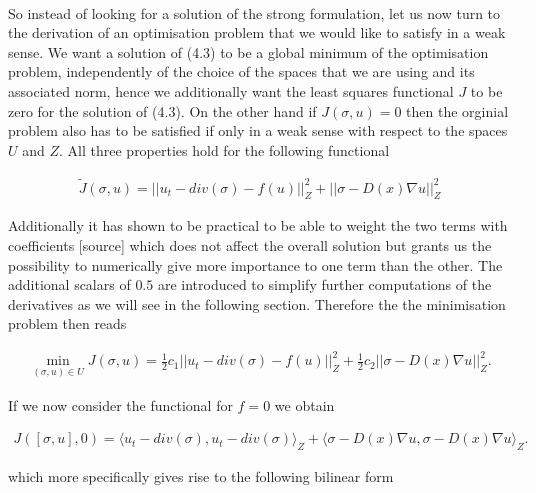 \documentclass[../draft_1.tex]{subfiles}
\begin{document}
\smallskip
\\
So instead of looking for a solution of the strong formulation, let us now turn to the derivation of an optimisation problem that we would like to satisfy in a weak sense. We want a solution of (4.3) to be a global minimum of the optimisation problem, independently of the choice of the spaces that we are using and its associated norm, hence we additionally want the least squares functional $J$ to be zero for the solution of (4.3). On the other hand if $J(\sigma, u) = 0$ then the orginial problem also has to be satisfied if only in a weak sense with respect to the spaces $U$ and $Z$. All three properties hold for the following functional  
\begin{ceqn}
\begin{align}
\tilde{J}(\sigma, u) =|| u_t - div(\sigma) - f(u) ||_Z^2 + || \sigma - D(x) \nabla u || _Z^2
\end{align}
\end{ceqn}
Additionally it has shown to be practical to be able to weight the two terms with coefficients [source] which does not affect the overall solution but grants us the possibility to numerically give more importance to one term than the other. The additional scalars of $0.5$ are introduced to simplify further computations of the derivatives as we will see in the following section. Therefore the the minimisation problem then reads
\begin{ceqn}
	\begin{align}
	\min_{(\sigma, u) \in U} J(\sigma, u) = \frac{1}{2} c_1 || u_t - div(\sigma) - f(u) ||_Z^2 + \frac{1}{2} c_2 || \sigma - D(x) \nabla u ||_Z^2.
	\end{align}
\end{ceqn}
If we now consider the functional for $ f = 0$ we obtain
\begin{ceqn}
	\begin{align}
J([\sigma, u], 0) = \langle u_t - div(\sigma), u_t - div(\sigma)\rangle_Z + \langle \sigma - D(x) \nabla u, \sigma - D(x) \nabla u \rangle_Z.
	\end{align}
\end{ceqn}
which more specifically gives rise to the following bilinear form
\end{document}
